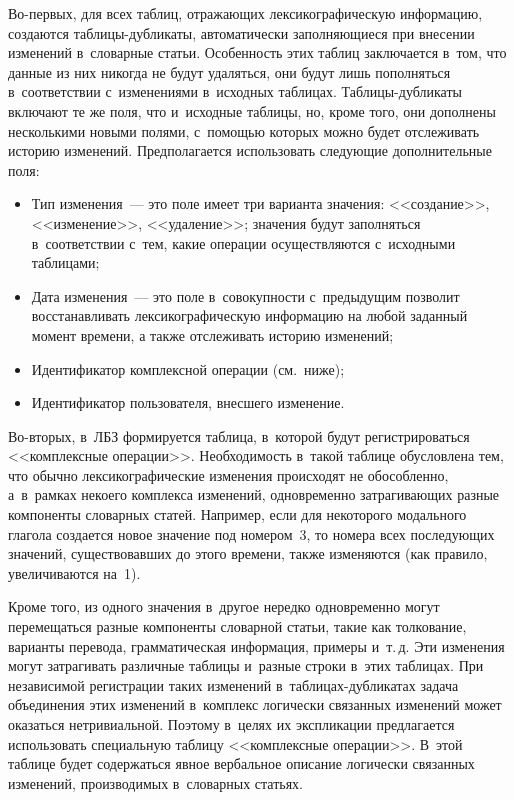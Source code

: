 \begin{multicols}{2}
    Во-первых, для всех таблиц, отражающих лексикографическую 
информацию, создаются таблицы-дубликаты, автоматически заполняющиеся 
при внесении изменений в~словарные статьи. Особенность этих таблиц 
заключается в~том, что данные из них никогда не будут удаляться, они будут 
лишь пополняться в~соответствии с~изменениями в~исходных таблицах. 
Таб\-ли\-цы-дуб\-ли\-ка\-ты включают те же поля, что и~исходные таблицы, но, 
кроме того, они дополнены несколькими новыми полями, с~помощью 
которых можно будет отслеживать историю изменений. Предполагается 
использовать следующие дополнительные поля:
    \begin{itemize}
\item Тип изменения~--- это поле имеет три варианта значения: 
<<создание>>, <<изменение>>, <<удаление>>; значения будут заполняться 
в~соответствии с~тем, какие операции осуществляются с~исходными 
таблицами;\\[-15pt]
\item Дата изменения~--- это поле в~совокупности с~предыдущим позволит 
восстанавливать лексикографическую информацию на любой заданный 
момент времени, а также отслеживать историю изменений;\\[-15pt]
\item Идентификатор комплексной операции (см.\ ниже);\\[-15pt]
\item Идентификатор пользователя, внесшего изменение.
\end{itemize}
    
    Во-вторых, в~ЛБЗ формируется таблица, в~которой будут 
регистрироваться <<комплексные операции>>. Необходимость в~такой 
таблице обусловлена тем, что обычно лексикографические изменения 
происходят не обособленно, а~в~рамках некоего комплекса изменений, 
одновременно за\-тра\-ги\-ва\-ющих разные компоненты словарных статей. 
Например, если для некоторого модального глагола создается новое значение 
под номером~3, то номера всех последующих значений, существовавших до 
этого времени, также изменяются (как правило, увеличиваются на~1). 
    
    Кроме того, из одного значения в~другое нередко одновременно могут 
перемещаться разные компоненты словарной статьи, такие как толкование, 
варианты перевода, грамматическая информация, примеры и~т.\,д. Эти 
изменения могут затрагивать различные таблицы и~разные строки в~этих 
таблицах. При независимой регистрации таких изменений  
в~таб\-ли\-цах-дуб\-ли\-ка\-тах задача объединения этих изменений 
в~комплекс логически связанных изменений может оказаться нетривиальной. 
Поэтому в~целях их экспликации предлагается использовать специальную 
таблицу <<комплексные операции>>. В~этой таблице будет содержаться 
явное вербальное описание логически связанных изменений, производимых 
в~словарных статьях.
    

\end{multicols}
